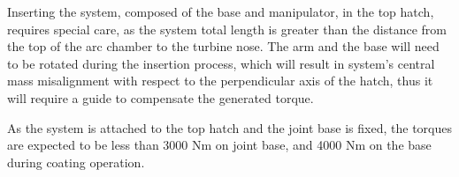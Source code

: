 Inserting the system, composed of the base and manipulator, in the top
hatch, requires special care, as the system total length is greater
than the distance from the top of the arc chamber to the turbine nose. The arm
and the base will need to be rotated during the insertion process, which will
result in system's central mass misalignment with respect to the
perpendicular axis of the hatch, thus it will require a guide to compensate
the generated torque.



As the system is attached to the top hatch and the joint base is fixed,
the torques are expected to be less than 3000 Nm on joint base, and 4000 Nm on
the base during coating operation.



